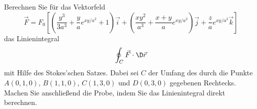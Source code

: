 \begin{atiTask}[
  title = Verifikation des Satzes von Stokes
]
Berechnen Sie für das Vektorfeld
\[
\vec{F}=F_0\left[\left(\frac{y^3}{3a^3}+\frac{y}{a}e^{xy/a^2}+1\right)\vec{i}+\left(\frac{xy^2}{a^3}+\frac{x+y}{a}e^{xy/a^2}\right)\vec{j}+\frac{z}{a}e^{xy/a^2}\vec{k}\right]
\]
das Linienintegral 
\[
\oint_C\vec{F}\cdot \D \vec{r}
\]
mit Hilfe des Stokes'schen Satzes. Dabei sei $C$ der Umfang des durch die Punkte $A(0,1,0)$, $B(1,1,0)$, $C(1,3,0)$ und $D(0,3,0)$ gegebenen Rechtecks. Machen Sie anschließend die Probe, indem Sie das Linienintegral direkt berechnen.
\end{atiTask}